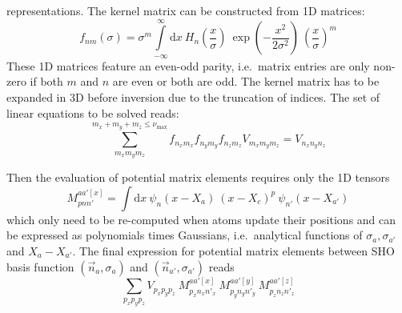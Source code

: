 \documentclass[oribibl]{llncs}
\newcommand{\um}[1]{_{\mathrm{#1}}}
\newcommand{\numax}{\nu\um{max}}
\begin{document}
representations. The kernel matrix can be constructed from 1D matrices:
$$ f_{nm}(\sigma) = \sigma^m \int\limits_{-\infty}^{\infty} \mathrm dx \  H_{n}\left( \frac{x}{\sigma} \right) \  \exp\left( -\frac{x^2}{2\sigma^2} \right) \  \left(\frac{x}{\sigma}\right)^m $$
These 1D matrices feature an even-odd parity, 
i.e.~matrix entries are only non-zero if both $m$ and $n$ are even or both are odd.
The kernel matrix has to be expanded in 3D before inversion due to the truncation
of indices. The set of linear equations to be solved reads:
$$ \sum_{m_x m_y m_z}^{m_x + m_y + m_z \leq \numax} f_{n_x m_x} f_{n_y m_y} f_{n_z m_z} V_{m_x m_y m_z} = V_{n_x n_y n_z} $$

\noindent
Then the evaluation of potential matrix elements requires only the 1D tensors
\begin{equation}
	M_{pnn'}^{aa'[x]} = \int \mathrm d x  \  \psi_{n}(x - X_{a}) \  (x - X_{c})^{p} \  \psi_{n'}(x - X_{a'})
	\label{eq:local_moment_matrix_elements}
\end{equation}
which only need to be re-computed when atoms update their positions
and can be expressed as polynomials times Gaussians, i.e.~analytical functions of $\sigma_a, \sigma_{a'}$ and $X_a - X_{a'}$.
The final expression for potential matrix elements between SHO basis function $(\vec n_a,\sigma_a)$ and $(\vec n_{a'},\sigma_{a'})$ reads
\begin{equation}
	\sum_{p_x p_y p_z} V_{p_x p_y p_z} \  M_{p_x n_x n'_x}^{aa'[x]} \  M_{p_y n_y n'_y}^{aa'[y]} \  M_{p_z n_z n'_z}^{aa'[z]}
	\label{eq:local_moment_matrix_elements_from_tensors}
\end{equation}
\end{document}
